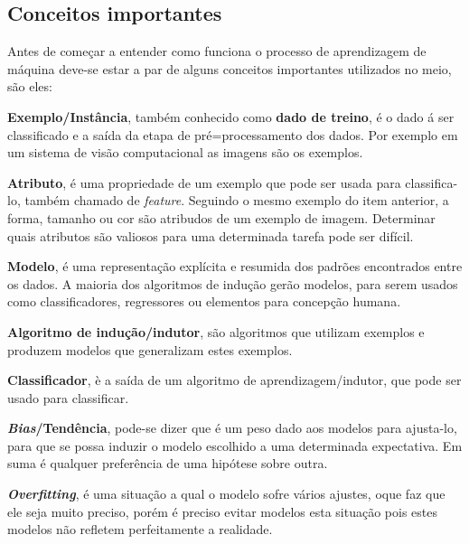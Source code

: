  \subsection{Conceitos importantes}
 \label{subsec:conceitos}
 Antes de começar a entender como funciona o processo de aprendizagem de máquina deve-se estar a par de alguns conceitos importantes 
 utilizados no meio, são eles:
  \begin{alineas}
  	\item \textbf{Exemplo/Instância}, também conhecido como \textbf{dado de treino}, é o dado á ser classificado e a saída da etapa de pré=processamento dos dados.
	Por exemplo em um sistema de visão computacional as imagens são os exemplos.
	\item \textbf{Atributo}, é uma propriedade de um exemplo que pode ser usada para classifica-lo, também chamado de \textit{feature}. Seguindo o mesmo exemplo do item anterior,
	a forma, tamanho ou cor são atribudos de um exemplo de imagem. Determinar quais atributos são valiosos para uma determinada tarefa pode 
	ser difícil.
	\item \textbf{Modelo}, é uma representação explícita e resumida dos padrões encontrados entre os dados. A maioria dos algoritmos de indução gerão modelos,
	para serem usados como classificadores, regressores ou elementos para concepção humana.
	\item \textbf{Algoritmo de indução/indutor}, são algoritmos que utilizam exemplos e produzem modelos que generalizam estes exemplos.
	\item \textbf{Classificador}, è a saída de um algoritmo de aprendizagem/indutor, que pode ser usado para classificar.	
	\item \textbf{\textit{Bias}/Tendência}, pode-se dizer que é um peso dado aos modelos para ajusta-lo, para que se possa induzir o modelo escolhido
	 a uma determinada expectativa. Em suma é qualquer preferência de uma hipótese sobre outra.
	 \item \textbf{\textit{Overfitting}}, é uma situação a qual o modelo sofre vários ajustes, oque faz que ele seja muito preciso, 
	 porém é preciso evitar modelos  esta situação pois estes modelos não refletem perfeitamente a realidade.
  \end{alineas}  
